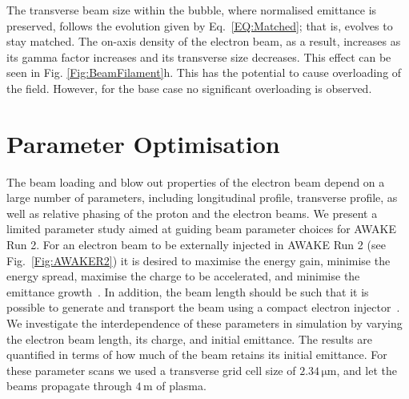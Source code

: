 \documentclass[aps,prstab,reprint,amsmath,amssymb,groupedaddress]{revtex4-1}
\newcommand{\unit}[1]{\,\mathrm{#1}}
\begin{document}
The transverse beam size within the bubble, where normalised emittance is preserved, follows the evolution given by
Eq.~\ref{EQ:Matched}; that is, evolves to stay matched. The on-axis density of the electron beam, as a result,
increases as its gamma factor increases and its transverse size decreases. This effect can be seen in Fig.
\ref{Fig:BeamFilament}h. This has the potential to cause overloading of the field. However, for the base case no
significant overloading is observed.  

\section{Parameter Optimisation}\label{S:PO}

The beam loading and blow out properties of the electron beam depend on a large number of parameters, including
longitudinal profile, transverse profile, as well as relative phasing of the proton and the electron beams. We present a
limited parameter study aimed at guiding beam parameter choices for AWAKE Run 2. For an electron beam to be externally
injected in AWAKE Run 2 (see Fig.~\ref{Fig:AWAKER2}) it is desired to maximise the energy gain, minimise the energy
spread, maximise the charge to be accelerated, and minimise the emittance growth~\cite{adli:2016}. In addition, the
beam length should be such that it is possible to generate and transport the beam using a compact electron
injector~\cite{adli:2016}. We investigate the interdependence of these parameters in simulation by varying the electron
beam length, its charge, and initial emittance. The results are quantified in terms of how much of the beam retains its
initial emittance. For these parameter scans we used a transverse grid cell size of $2.34\unit{\mu m}$, and let the
beams propagate through $4\unit{m}$ of plasma.
\end{document}
